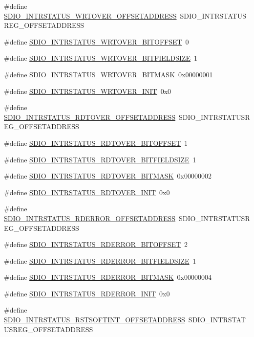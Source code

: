 \begin{DoxyCompactItemize}
\item 
\#define \hyperlink{a00571_a86a0a2db7a010b6bce6f4775a916de7d}{SDIO\_\-INTRSTATUS\_\-WRTOVER\_\-OFFSETADDRESS}~SDIO\_\-INTRSTATUSREG\_\-OFFSETADDRESS
\item 
\#define \hyperlink{a00571_a5d1d5d4d8e1c44f1ea8213b379cb4614}{SDIO\_\-INTRSTATUS\_\-WRTOVER\_\-BITOFFSET}~0
\item 
\#define \hyperlink{a00571_ab01b678f763d984a2662139c7b8b8b77}{SDIO\_\-INTRSTATUS\_\-WRTOVER\_\-BITFIELDSIZE}~1
\item 
\#define \hyperlink{a00571_afacca15bd053ededec9b888e162a4159}{SDIO\_\-INTRSTATUS\_\-WRTOVER\_\-BITMASK}~0x00000001
\item 
\#define \hyperlink{a00571_a3151ba535fdc175efad955026d0e6588}{SDIO\_\-INTRSTATUS\_\-WRTOVER\_\-INIT}~0x0
\item 
\#define \hyperlink{a00571_a06c2f455c438a47f4e10bdc202a5d6fd}{SDIO\_\-INTRSTATUS\_\-RDTOVER\_\-OFFSETADDRESS}~SDIO\_\-INTRSTATUSREG\_\-OFFSETADDRESS
\item 
\#define \hyperlink{a00571_ab5ee3f8e66beb37919a33c3422a64f5b}{SDIO\_\-INTRSTATUS\_\-RDTOVER\_\-BITOFFSET}~1
\item 
\#define \hyperlink{a00571_a9752efc7aa00d8f1064e6fb57991dfd2}{SDIO\_\-INTRSTATUS\_\-RDTOVER\_\-BITFIELDSIZE}~1
\item 
\#define \hyperlink{a00571_a2d689243aec1513906a8a0161a98f81f}{SDIO\_\-INTRSTATUS\_\-RDTOVER\_\-BITMASK}~0x00000002
\item 
\#define \hyperlink{a00571_a77034d5c4d8806f175ad9b49d324cbc2}{SDIO\_\-INTRSTATUS\_\-RDTOVER\_\-INIT}~0x0
\item 
\#define \hyperlink{a00571_a39cda110ec656c676c8952bf84bfb282}{SDIO\_\-INTRSTATUS\_\-RDERROR\_\-OFFSETADDRESS}~SDIO\_\-INTRSTATUSREG\_\-OFFSETADDRESS
\item 
\#define \hyperlink{a00571_aa126cb9f59150c2b52fd8d0f942f8c20}{SDIO\_\-INTRSTATUS\_\-RDERROR\_\-BITOFFSET}~2
\item 
\#define \hyperlink{a00571_af325cfbb7eebf55c78484d1de37b1e25}{SDIO\_\-INTRSTATUS\_\-RDERROR\_\-BITFIELDSIZE}~1
\item 
\#define \hyperlink{a00571_a8193c19de457386632a6ec151f39e8ec}{SDIO\_\-INTRSTATUS\_\-RDERROR\_\-BITMASK}~0x00000004
\item 
\#define \hyperlink{a00571_a4dd153d784bfe1a509153499ea577010}{SDIO\_\-INTRSTATUS\_\-RDERROR\_\-INIT}~0x0
\item 
\#define \hyperlink{a00571_a54580a53a77367fd7886666c0efdb6dc}{SDIO\_\-INTRSTATUS\_\-RSTSOFTINT\_\-OFFSETADDRESS}~SDIO\_\-INTRSTATUSREG\_\-OFFSETADDRESS

\end{DoxyCompactItemize}
